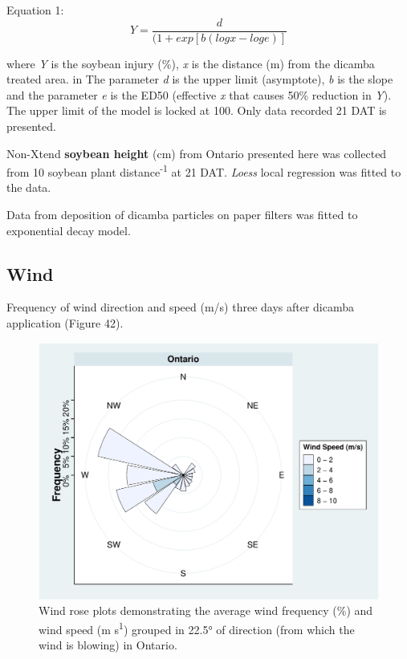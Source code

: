 \documentclass[]{article}
\begin{document}
Equation 1: \[Y= \frac{d}{(1 + exp[b(logx - loge)]} \]

where \emph{Y} is the soybean injury (\%), \emph{x} is the distance (m)
from the dicamba treated area. in The parameter \emph{d} is the upper
limit (asymptote), \emph{b} is the slope and the parameter \emph{e} is
the ED50 (effective \emph{x} that causes 50\% reduction in \emph{Y}).
The upper limit of the model is locked at 100. Only data recorded 21 DAT
is presented.

Non-Xtend \textbf{soybean height} (cm) from Ontario presented here was
collected from 10 soybean plant distance\textsuperscript{-1} at 21 DAT.
\emph{Loess} local regression was fitted to the data.

Data from deposition of dicamba particles on paper filters was fitted to
exponential decay model.

\pagebreak
\newpage

\subsection{Wind}\label{wind-4}

Frequency of wind direction and speed (m/s) three days after dicamba
application (Figure 42).

\begin{figure}
\centering
\includegraphics{Report_files/figure-latex/unnamed-chunk-88-1.pdf}
\caption{Wind rose plots demonstrating the average wind frequency (\%)
and wind speed (m s\textsuperscript{1}) grouped in 22.5° of direction
(from which the wind is blowing) in Ontario.}
\end{figure}
\end{document}
